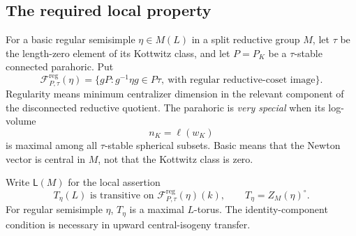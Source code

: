 \documentclass[11pt,a4paper]{article}
\theoremstyle{definition}
\theoremstyle{remark}
\begin{document}
\subsection{The required local property}
For a basic regular semisimple \(\eta\in M(L)\) in a split reductive
group \(M\), let \(\tau\) be the length-zero element of its Kottwitz
class, and let \(P=P_K\) be a \(\tau\)-stable connected parahoric. Put
\[
\mathcal F^{\mathrm{reg}}_{P,\tau}(\eta)=
\{gP:g^{-1}\eta g\in P\dot\tau,\
\text{with regular reductive-coset image}\}.
\]
Regularity means minimum centralizer dimension in the relevant
component of the disconnected reductive quotient. The parahoric is
\emph{very special} when its log-volume
\[
n_K=\ell(w_K)
\]
is maximal among all \(\tau\)-stable spherical subsets. Basic means
that the Newton vector is central in \(M\), not that the Kottwitz
class is zero.

Write \(\mathsf L(M)\) for the local assertion
\[
T_\eta(L)\text{ is transitive on }
\mathcal F^{\mathrm{reg}}_{P,\tau}(\eta)(k),
\qquad T_\eta=Z_M(\eta)^\circ.
\]
For regular semisimple \(\eta\), \(T_\eta\) is a maximal \(L\)-torus.
The identity-component condition is necessary in upward
central-isogeny transfer.
\end{document}
